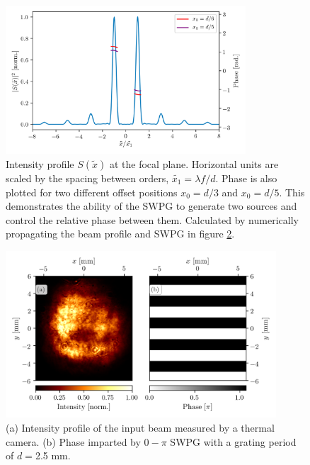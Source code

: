 \begin{figure}
	\centering
	\includegraphics[width=0.8\textwidth]{figures/Two_source/intensity_and_phase.png}
	\caption{Intensity profile $S(\tilde{x})$ at the focal plane. Horizontal units are scaled by the spacing between orders, $\tilde{x_1}=\lambda f/d$.  Phase is also plotted for two different offset positions $x_0=d/3$ and $x_0=d/5$.  This demonstrates the ability of the SWPG to generate two sources and control the relative phase between them. Calculated by numerically propagating the beam profile and SWPG in figure \ref{fig:LP_inputs}.}
	\label{fig:s^2}
\end{figure}
\begin{figure}
	\centering
	\includegraphics[width=0.9\textwidth]{figures/Two_source/LP_images.png}
	\caption{(a) Intensity profile of the input beam measured by a thermal camera. (b) Phase imparted by $0-\pi$ SWPG with a grating period of $d=$2.5 mm.}
	\label{fig:LP_inputs}
\end{figure}

